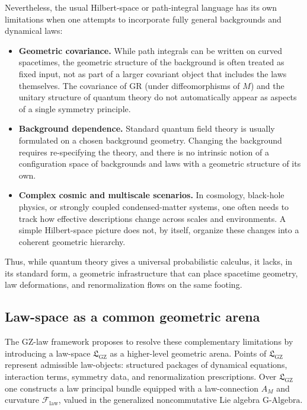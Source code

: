 \documentclass[11pt]{book}
\newcommand{\GAlgebra}{\text{G-Algebra}}
\newcommand{\GZLS}{\ensuremath{\mathfrak{L}_{\mathrm{GZ}}}}
\newcommand{\GZLOC}{\ensuremath{A_M}}
\newcommand{\GZLCurv}{\ensuremath{\mathcal{F}_{\mathrm{law}}}}
\newcommand{\Base}{\ensuremath{M}}
\theoremstyle{plain}
\theoremstyle{definition}
\theoremstyle{remark}
\begin{document}
Nevertheless, the usual Hilbert-space or path-integral language has
its own limitations when one attempts to incorporate fully general
backgrounds and dynamical laws:

\begin{itemize}
  \item \textbf{Geometric covariance.}
        While path integrals can be written on curved spacetimes,
        the geometric structure of the background is often treated
        as fixed input, not as part of a larger covariant object
        that includes the laws themselves. The covariance of GR
        (under diffeomorphisms of $\Base$) and the unitary structure
        of quantum theory do not automatically appear as aspects of
        a single symmetry principle.
  \item \textbf{Background dependence.}
        Standard quantum field theory is usually formulated on a
        chosen background geometry. Changing the background requires
        re-specifying the theory, and there is no intrinsic notion
        of a configuration space of backgrounds and laws with a
        geometric structure of its own.
  \item \textbf{Complex cosmic and multiscale scenarios.}
        In cosmology, black-hole physics, or strongly coupled
        condensed-matter systems, one often needs to track how
        effective descriptions change across scales and environments.
        A simple Hilbert-space picture does not, by itself, organize
        these changes into a coherent geometric hierarchy.
\end{itemize}

Thus, while quantum theory gives a universal probabilistic calculus,
it lacks, in its standard form, a geometric infrastructure that can
place spacetime geometry, law deformations, and renormalization
flows on the same footing.

\subsection{Law-space as a common geometric arena}
\label{subsec:lawspace-arena}



The GZ-law framework proposes to resolve these complementary
limitations by introducing a law-space $\GZLS$ as a higher-level
geometric arena. Points of $\GZLS$ represent admissible law-objects:
structured packages of dynamical equations, interaction terms,
symmetry data, and renormalization prescriptions. Over $\GZLS$ one
constructs a law principal bundle equipped with a law-connection
$\GZLOC$ and curvature $\GZLCurv$, valued in the generalized
noncommutative Lie algebra $\GAlgebra$.
\end{document}
